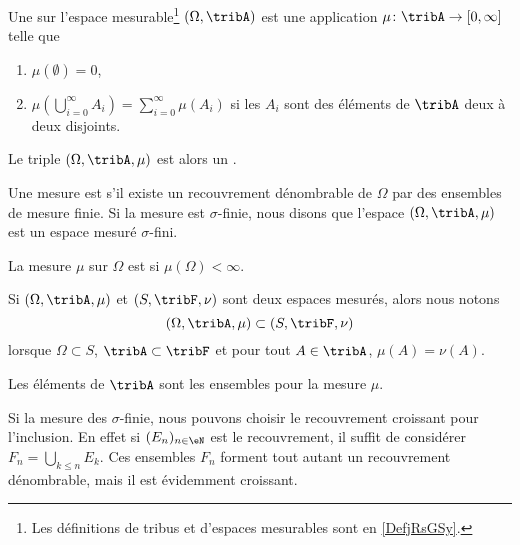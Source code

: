 \begin{definition}  \label{DefBTsgznn}
    Une  sur l'espace mesurable\footnote{Les définitions de tribus et d'espaces mesurables sont en \ref{DefjRsGSy}.} \( (\Omega,\tribA)\) est une application \( \mu\colon \tribA\to \mathopen[ 0 , \infty \mathclose]\) telle que
    \begin{enumerate}
        \item
            \( \mu(\emptyset)=0\),
        \item   \label{ItemQFjtOjXiii}
            \( \mu\left( \bigcup_{i=0}^{\infty}A_i\right)=\sum_{i=0}^{\infty}\mu(A_i)\) si les \( A_i\) sont des éléments de \( \tribA\) deux à deux disjoints.
    \end{enumerate}
            Le triple \( (\Omega,\tribA,\mu)\) est alors un .

    Une mesure est  s'il existe un recouvrement dénombrable de \( \Omega\) par des ensembles de mesure finie. Si la mesure est $\sigma$-finie, nous disons que l'espace \( (\Omega,\tribA,\mu)\) est un espace mesuré $\sigma$-fini.

    La mesure \( \mu\) sur \( \Omega\) est  si \( \mu(\Omega)<\infty\).
\end{definition}

Si \( (\Omega,\tribA,\mu)\) et \( (S,\tribF,\nu)\) sont deux espaces mesurés, alors nous notons
\begin{equation}
    (\Omega,\tribA,\mu)\subset (S,\tribF,\nu)
\end{equation}
lorsque \( \Omega\subset S\), \( \tribA\subset\tribF\) et pour tout \( A\in\tribA\), \( \mu(A)=\nu(A)\).

\begin{definition}\label{DefHGsQxHB}
    Les éléments de \( \tribA\) sont les ensembles  pour la mesure \( \mu\).
\end{definition}

Si la mesure des \( \sigma\)-finie, nous pouvons choisir le recouvrement croissant pour l'inclusion. En effet si \( (E_n)_{n\in \eN}\) est le recouvrement, il suffit de considérer \( F_n=\bigcup_{k\leq n}E_k\). Ces ensembles \( F_n\) forment tout autant un recouvrement dénombrable, mais il est évidemment croissant.

